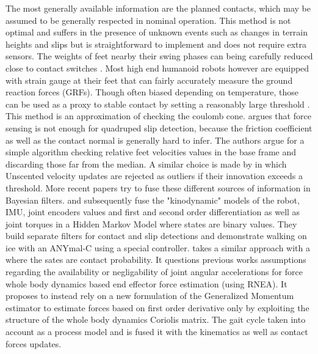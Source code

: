 The most generally available information are the planned contacts, which may be assumed to be generally respected in nominal operation. 
This method is not optimal and suffers in the presence of unknown events such as changes in terrain heights and slips but is straightforward to implement and 
does not require extra sensors. The weights of feet nearby their swing phases can being carefully reduced close to contact switches \cite{leziart2021implementation, bledt2018contact}. 
Most high end humanoid robots however \cite{stasse2017talos, englsberger2014overview} are equipped with strain gauge at their feet that can fairly accurately measure the ground reaction forces (GRFs). 
Though often biased depending on temperature, those can be used as a proxy to stable contact by setting a reasonably large threshold \cite{fallon2014drift}. 
This method is an approximation of checking the coulomb cone.
\cite{Focchi2015SlipDA} argues that force sensing is not enough for quadruped slip detection, because the friction coefficient
as well as the contact normal is generally hard to infer. The authors argue for a simple algorithm checking relative feet velocities values in the base frame and discarding those
far from the median. A similar choice is made by \cite{bloesch2013stateSlippery} in which Unscented \KalmanF velocity updates are rejected as outliers if their innovation exceeds a threshold.  
More recent papers try to fuse these different sources of information in Bayesian filters. \cite{hwangbo2016probabilistic} and subsequently \cite{jenelten2019dynamic} fuse 
the  "kinodynamic" models of the robot, IMU, joint encoders values and first and second order differentiation as well as
joint torques in a Hidden Markov Model where states are binary values. They build separate filters for contact and slip detections and demonstrate walking on ice with an ANYmal-C using a special controller.
\cite{bledt2018contact} takes a similar approach with a \KalmanF where the sates are contact probability. It questions previous works assumptions regarding the availability 
\cite{hwangbo2016probabilistic} or negligability \cite{camurri2017probabilistic} of joint angular accelerations for force whole body dynamics based end effector force estimation (using RNEA).
It proposes to instead rely on a new formulation of the Generalized Momentum estimator to estimate forces based on first order derivative only by exploiting the 
structure of the whole body dynamics Coriolis matrix. The gait cycle taken into account as a process model and is fused it with the kinematics as well as contact forces updates.  

